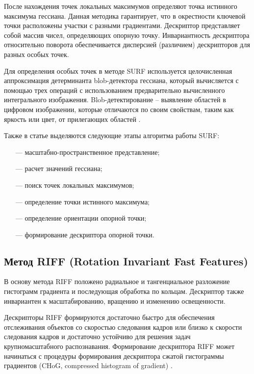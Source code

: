 После нахождения точек локальных максимумов определяют точка истинного максимума гессиана. Данная методика гарантирует, что в окрестности ключевой точки расположены участки с разными градиентами. Дескриптор
представляет собой массив чисел, определяющих опорную точку. Инвариантность дескриптора относительно поворота обеспечивается дисперсией (различием) дескрипторов для разных особых точек.

Для определения особых точек в методе SURF используется целочисленная
аппроксимация детерминанта blob-детектора гессиана, который вычисляется с
помощью трех операций с использованием предварительно вычисленного 
интегрального изображения. Blob-детектирование -- выявление областей в
цифровом изображении, которые отличаются по своим свойствам, таким как
яркость или цвет, от прилегающих областей \cite{siftsurf}. 


Также в статье \cite{siftsurf} выделяются следующие этапы алгоритма работы SURF:
\begin{itemize}
	\item[---] масштабно-пространственное представление;
	\item[---] расчет значений гессиана;
	\item[---] поиск точек локальных максимумов;
	\item[---] определение точки истинного максимума;
	\item[---] определение ориентации опорной точки;
	\item[---] формирование дескриптора опорной точки. 	
\end{itemize}



\subsection{Метод RIFF (Rotation Invariant Fast Features)}
В основу метода RIFF положено радиальное
и тангенциальное разложение гистограмм
градиента и последующая обработка по кольцам.
Дескриптор также инвариантен к масштабированию, вращению и изменению освещенности.

Дескрипторы RIFF формируются достаточно быстро для обеспечения отслеживания объектов со скоростью следования кадров или близко к скорости следования кадров и достаточно устойчиво для решения задач крупномасштабного распознавания. Формирование дескриптора RIFF может начинаться с процедуры формирования дескриптора сжатой гистограммы градиентов (CHoG, compressed histogram of gradient) \cite{sift1}.

